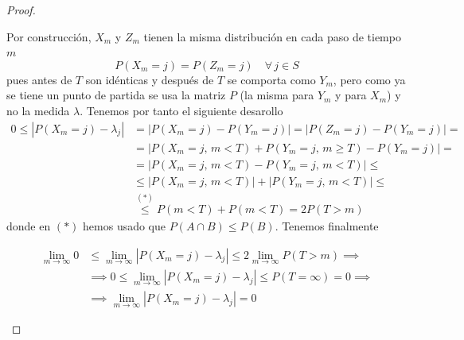 \documentclass[10pt]{book}
\begin{document}
\begin{teo}
\begin{proof}
\begin{description}
        \noindent Por construcción, $X_m$ y $Z_m$ tienen la misma distribución en cada paso de tiempo $m$
        $$P(X_m = j) = P(Z_m = j) \quad \forall \, j \in S$$
        pues antes de $T$ son idénticas y después de $T$ se comporta como $Y_m$, pero como ya se tiene un punto de partida se usa la matriz $P$ (la misma para $Y_m$ y para $X_m$) y no la medida $\lambda$. Tenemos por tanto el siguiente desarollo
        \begin{align*}
            0\le \left| P(X_m = j) - \lambda_j \right| &= \left| P(X_m = j) - P(Y_m = j) \right| = \left| P(Z_m = j) - P(Y_m = j) \right| = \\
            &= \left| P(X_m = j, \, m < T) + P(Y_m = j, \, m \ge T) - P(Y_m = j) \right| = \\
            &= \left| P(X_m = j, \, m < T) - P(Y_m = j, \, m < T) \right| \le \\
            &\le \left| P(X_m = j, \, m < T) \right| + \left| P(Y_m = j, \, m < T) \right| \le \\
            &\overset{(*)}{\le} P(m < T) + P(m < T) = 2P(T > m)
        \end{align*}
        donde en $(*)$ hemos usado que $P(A \cap B) \le P(B)$. Tenemos finalmente


        \begin{align*}
            \lim_{m \to \infty} 0 &\le \lim_{m \to \infty} \left| P(X_m = j) - \lambda_j \right| \le 2 \lim_{m \to \infty} P(T > m) \implies \\
            &\implies  0\le \lim_{m \to \infty} \left| P(X_m = j) - \lambda_j \right| \le P(T = \infty) = 0 \implies \\
            &\implies \lim_{m \to \infty} \left| P(X_m = j) - \lambda_j \right| = 0
        \end{align*}

\end{description}
\end{proof}
\end{teo}
\end{document}
